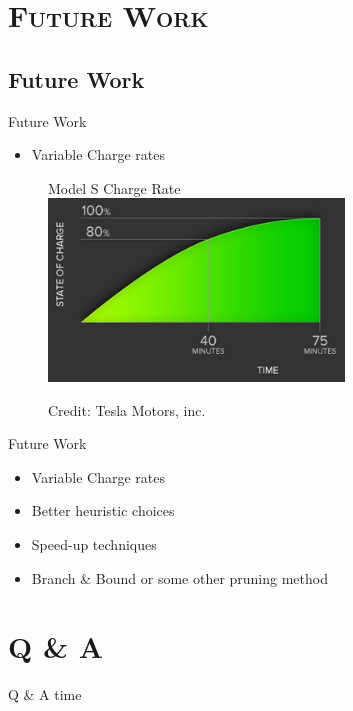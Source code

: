 \section{\scshape Future Work}
\subsection{Future Work}
\begin{frame}{Future Work}
\begin{itemize}
\item Variable Charge rates
\end{itemize}
\begin{figure}[h!]
  \centering
  Model S Charge Rate
    \includegraphics[width=0.7\textwidth]{chargerate}
  
      \tiny Credit: Tesla Motors, inc.
\end{figure}
\vspace{10cm}
\end{frame}

\begin{frame}{Future Work}
\begin{itemize}
\item Variable Charge rates
\item Better heuristic choices
\item Speed-up techniques
\item Branch \& Bound or some other pruning method
\end{itemize}
\vspace{10cm}
\end{frame}

\section{\scshape Q \& A}
\begin{frame}{Q \& A time}
\end{frame}
